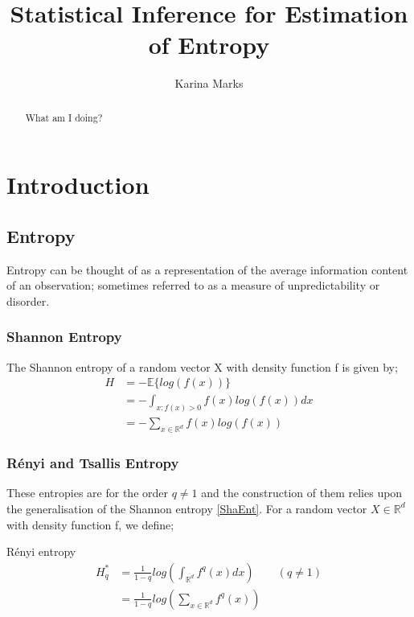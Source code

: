 \documentclass{report}
\title{Statistical Inference for Estimation of Entropy}
\author{Karina Marks}
\begin{document}
\begin{titlepage}
\maketitle
\begin{abstract}
 What am I doing?
\end{abstract}
\end{titlepage}


\tableofcontents


\chapter{Introduction}


\section{Entropy}

Entropy can be thought of as a representation of the average information content of an observation; sometimes referred to as a measure of unpredictability or disorder. 

\subsection{Shannon Entropy}
The Shannon entropy of a random vector X with density function f is given by;
\begin{align} 
H &= - \mathbb{E} \{log(f(x))\} \nonumber \\
&= - \int_{x : f(x) > 0} f(x) log(f(x)) dx \nonumber \\
&= - \sum_{x \in \mathbb{R}^{d}} f(x) log(f(x)) \label{ShaEnt}
\end{align} 

\subsection{ R\'enyi and Tsallis Entropy}
These entropies are for the order $q \neq 1$ and the construction of them relies upon the generalisation of the Shannon entropy \ref{ShaEnt}. For a random vector $X \in \mathbb{R}^d$ with density function f, we define;

R\'enyi entropy
\begin{align} 
H_{q}^{*} &= \frac{1}{1-q} log \left( \int_{\mathbb{R}^d} f^q (x) dx \right) \quad  \quad (q \neq 1) \label{RenEnt} \\
&=  \frac{1}{1-q} log \left( \sum_{x \in \mathbb{R}^{d}} f^q (x) \right) \nonumber 
\end{align}
\end{document}
